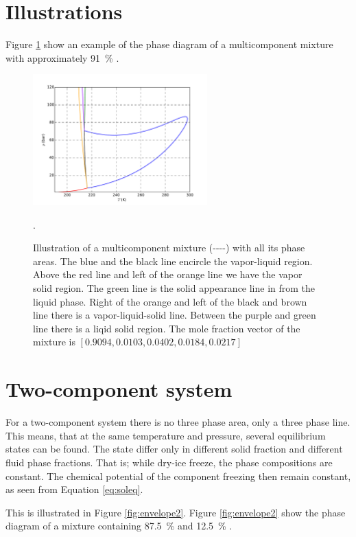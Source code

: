 \documentclass[english]{../thermomemo/thermomemo}
\begin{document}
\section{Illustrations}
Figure \ref{fig:envelope} show an example of the phase diagram of a
multicomponent mixture with approximately \SI{91}{\percent} .
\begin{figure}[ht]
  \centering
  \includegraphics[width=0.6\textwidth]{envelope}
  \caption{Illustration of a multicomponent mixture
    (----) with all its phase
    areas. The blue and the black line encircle the vapor-liquid
    region. Above the red line and left of the orange line we have the
    vapor solid region. The green line is the solid appearance line in
    from the liquid phase. Right of the orange and left of the black
    and brown line there is a vapor-liquid-solid line. Between the
    purple and green line there is a liqid solid region. The mole
    fraction vector of the mixture is
    $\left[0.9094,0.0103,0.0402,0.0184,0.0217\right]$}.
  \label{fig:envelope}
\end{figure}

\section{Two-component system}
For a two-component system there is no three phase area, only a three
phase line. This means, that at the same temperature and pressure,
several equilibrium states can be found. The state differ only in
different solid fraction and different fluid phase fractions. That is;
while dry-ice freeze, the phase compositions are constant. The
chemical potential of the component freezing then remain constant, as
seen from Equation \ref{eq:soleq}.

This is illustrated in Figure \ref{fig:envelope2}. Figure
\ref{fig:envelope2} show the phase diagram of a mixture containing
\SI{87.5}{\percent}  and \SI{12.5}{\percent} .
\end{document}
